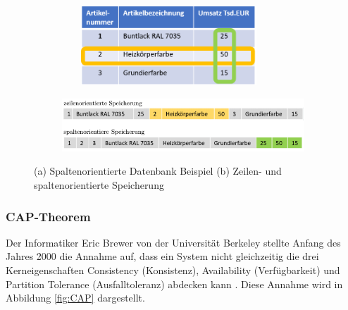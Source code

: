 \begin{figure}[h]
	\begin{subfigure}{\textwidth}
		\centering
		\includegraphics[width=8cm, height = 3cm]{images/SpaltenorientiereDatenbank.png}
		\caption{}
		\label{fig:spalten_zeilen_speicher}
	\end{subfigure}
	\newline
	\begin{subfigure}{\textwidth}
		\centering
		\includegraphics[width=15cm]{images/zeilenspaltenorientiert.png}
		\caption{ }
		\label{fig:spalten_zeilen}
	\end{subfigure}
	\caption[Zeilen- und spaltenorientierte Speicherung]{(a) Spaltenorientierte Datenbank Beispiel (b) Zeilen- und spaltenorientierte Speicherung \protect \footnotemark}
\label{fig:Spaltenorientiert}
\end{figure}


\subsubsection{CAP-Theorem}
Der Informatiker Eric Brewer von der Universität Berkeley stellte Anfang des Jahres 2000 die Annahme auf, dass ein System nicht gleichzeitig die drei Kerneigenschaften Consistency (Konsistenz), Availability (Verfügbarkeit) und Partition Tolerance (Ausfalltoleranz) abdecken kann \cite{DB1.6}. Diese Annahme wird in Abbildung \ref{fig:CAP} dargestellt.
\newline

